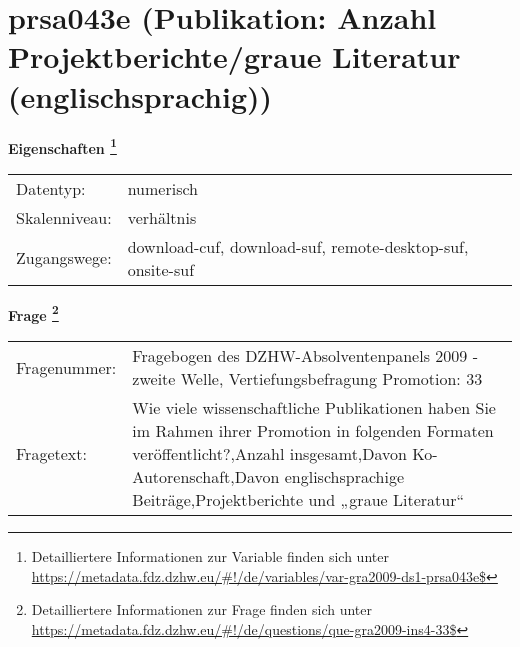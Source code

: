 
    \setcounter{footnote}{0}

    \vspace*{-1.8cm}
	\section{prsa043e (Publikation: Anzahl Projektberichte/graue Literatur (englischsprachig))}
	\label{section:prsa043e}



    \vspace*{0.5cm}
    \noindent\textbf{Eigenschaften
	\footnote{Detailliertere Informationen zur Variable finden sich unter
		\url{https://metadata.fdz.dzhw.eu/\#!/de/variables/var-gra2009-ds1-prsa043e$}}}\\
	\begin{tabularx}{\hsize}{@{}lX}
	Datentyp: & numerisch \\
	Skalenniveau: & verhältnis \\
	Zugangswege: &
	  download-cuf, 
	  download-suf, 
	  remote-desktop-suf, 
	  onsite-suf
 \\
    \end{tabularx}



				\vspace*{0.5cm}
                \noindent\textbf{Frage
	                \footnote{Detailliertere Informationen zur Frage finden sich unter
		              \url{https://metadata.fdz.dzhw.eu/\#!/de/questions/que-gra2009-ins4-33$}}}\\
				\begin{tabularx}{\hsize}{@{}lX}
					Fragenummer: &
					  Fragebogen des DZHW-Absolventenpanels 2009 - zweite Welle, Vertiefungsbefragung Promotion:
					  33
 \\
					Fragetext: & Wie viele wissenschaftliche Publikationen haben Sie im Rahmen ihrer Promotion in folgenden Formaten veröffentlicht?,Anzahl insgesamt,Davon Ko-Autorenschaft,Davon englischsprachige Beiträge,Projektberichte und „graue Literatur“ \\
				\end{tabularx}





